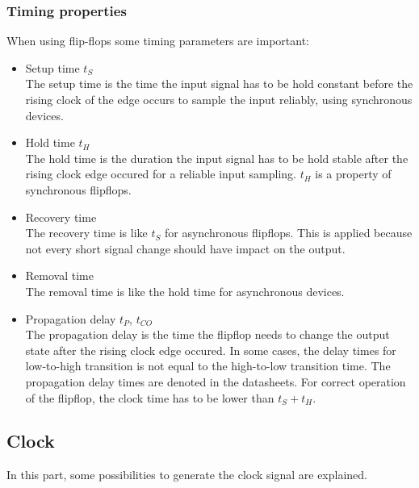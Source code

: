 \subsubsection{Timing properties}
When using flip-flops some timing parameters are important:
\begin{itemize}
\item Setup time $t_{S}$\\
The setup time is the time the input signal has to be hold constant before the rising clock of the edge occurs to sample the input reliably, using synchronous devices.
\item Hold time $t_{H}$\\
The hold time is the duration the input signal has to be hold stable after the rising clock edge occured for a reliable input sampling. $t_{H}$ is a property of synchronous flipflops.
\item Recovery time\\
The recovery time is like $t_{S}$ for asynchronous flipflops. This is applied because not every short signal change should have impact on the output. 
\item Removal time\\
The removal time is like the hold time for asynchronous devices.
\item Propagation delay $t_{P}$, $t_{CO}$\\
The propagation delay is the time the flipflop needs to change the output state after the rising clock edge occured. In some cases, the delay times for low-to-high transition is not equal to the high-to-low transition time. The propagation delay times are denoted in the datasheets. For correct operation of the flipflop, the clock time has to be lower than $t_{S}+t_{H}$.
\end{itemize}
\subsection{Clock}
In this part, some possibilities to generate the clock signal are explained.

